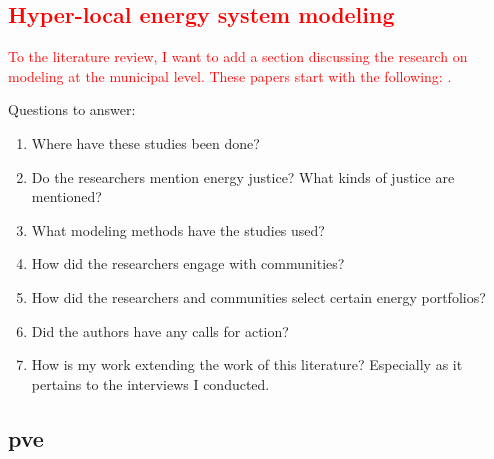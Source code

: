 \textcolor{red}{\subsection{Hyper-local energy system modeling}}
\textcolor{red}{To the literature review, I want to add a section discussing 
the research on modeling at the municipal level. These papers start with the 
following: 
\cite{mckenna_combining_2018,johannsen_municipal_2023,ben_amer_too_2020}.}

Questions to answer:

\begin{enumerate}
    \item Where have these studies been done?
    \item Do the researchers mention energy justice? What kinds of justice are mentioned?
    \item What modeling methods have the studies used?
    \item How did the researchers engage with communities?
    \item How did the researchers and communities select certain energy portfolios?
    \item Did the authors have any calls for action?
    \item How is my work extending the work of this literature? Especially as it pertains to the interviews I conducted.
\end{enumerate}



\subsection{\Acl{pve}}

